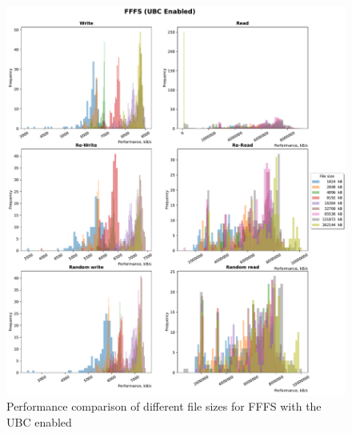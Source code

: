 \begin{figure}[!htb]
	\label{fig:bench_fffs_with_cache}
	\begin{center}
		\includegraphics[width=1.0\textwidth]{figures.nosync/benchmarking/FFFS/FFFS-UBC Enabled-hist.pdf}
	\end{center}
	\caption{Performance comparison of different file sizes for FFFS with the UBC enabled}
\end{figure}

